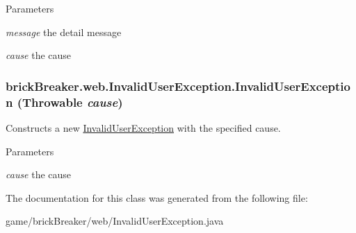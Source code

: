 \begin{DoxyParams}{Parameters}
\item[{\em message}]the detail message \item[{\em cause}]the cause \end{DoxyParams}
\hypertarget{classbrick_breaker_1_1web_1_1_invalid_user_exception_a3d20137414f9e52364048c36045ffac0}{
\subsubsection[{InvalidUserException}]{\setlength{\rightskip}{0pt plus 5cm}brickBreaker.web.InvalidUserException.InvalidUserException (Throwable {\em cause})}}
\label{classbrick_breaker_1_1web_1_1_invalid_user_exception_a3d20137414f9e52364048c36045ffac0}
Constructs a new {\ttfamily \hyperlink{classbrick_breaker_1_1web_1_1_invalid_user_exception}{InvalidUserException}} with the specified cause.


\begin{DoxyParams}{Parameters}
\item[{\em cause}]the cause \end{DoxyParams}


The documentation for this class was generated from the following file:\begin{DoxyCompactItemize}
\item 
game/brickBreaker/web/InvalidUserException.java\end{DoxyCompactItemize}
